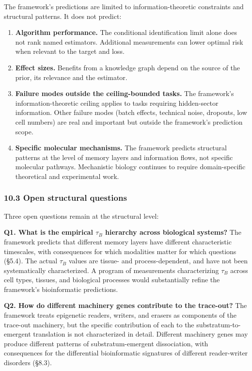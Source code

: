 \documentclass[
]{article}
\begin{document}
The framework's predictions are limited to information-theoretic
constraints and structural patterns. It does not predict:

\begin{enumerate}
\def\labelenumi{(\roman{enumi})}
\item
  \textbf{Algorithm performance.} The conditional identification limit
  alone does not rank named estimators. Additional measurements can
  lower optimal risk when relevant to the target and loss.
\item
  \textbf{Effect sizes.} Benefits from a knowledge graph depend on the
  source of the prior, its relevance and the estimator.
\item
  \textbf{Failure modes outside the ceiling-bounded tasks.} The
  framework's information-theoretic ceiling applies to tasks requiring
  hidden-sector information. Other failure modes (batch effects,
  technical noise, dropouts, low cell numbers) are real and important
  but outside the framework's prediction scope.
\item
  \textbf{Specific molecular mechanisms.} The framework predicts
  structural patterns at the level of memory layers and information
  flows, not specific molecular pathways. Mechanistic biology continues
  to require domain-specific theoretical and experimental work.
\end{enumerate}

\hypertarget{open-structural-questions}{%
\subsubsection{10.3 Open structural
questions}\label{open-structural-questions}}

Three open questions remain at the structural level:

\textbf{Q1. What is the empirical \(\tau_B\) hierarchy across biological
systems?} The framework predicts that different memory layers have
different characteristic timescales, with consequences for which
modalities matter for which questions (§5.4). The actual \(\tau_B\)
values are tissue- and process-dependent, and have not been
systematically characterized. A program of measurements characterizing
\(\tau_B\) across cell types, tissues, and biological processes would
substantially refine the framework's bioinformatic predictions.

\textbf{Q2. How do different machinery genes contribute to the
trace-out?} The framework treats epigenetic readers, writers, and
erasers as components of the trace-out machinery, but the specific
contribution of each to the substratum-to-emergent translation is not
characterized in detail. Different machinery genes may produce different
patterns of substratum-emergent dissociation, with consequences for the
differential bioinformatic signatures of different reader-writer
disorders (§8.3).
\end{document}
